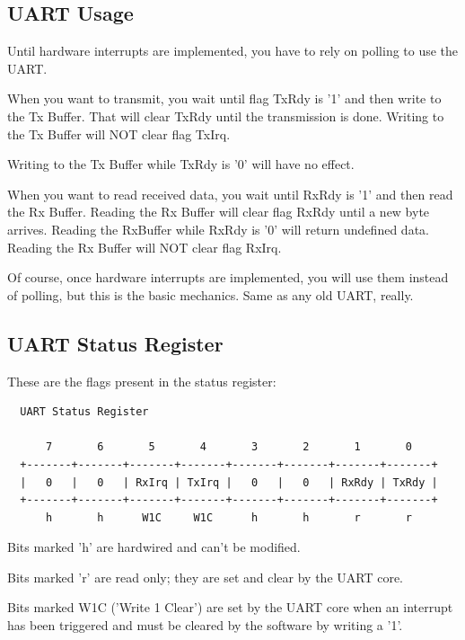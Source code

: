     
\subsection{UART Usage}
\label{soc_uart_usage}    
    
    Until hardware interrupts are implemented, you have to rely on polling to 
    use the UART.
    
    When you want to transmit, you wait until flag TxRdy is '1' and then write
    to the Tx Buffer. That will clear TxRdy until the transmission is done. 
    Writing to the Tx Buffer will NOT clear flag TxIrq. 
    
    Writing to the Tx Buffer while TxRdy is '0' will have no effect.
    
    When you want to read received data, you wait until RxRdy is '1' and then 
    read the Rx Buffer. Reading the Rx Buffer will clear flag RxRdy until a new 
    byte arrives.
    Reading the RxBuffer while RxRdy is '0' will return undefined data.
    Reading the Rx Buffer will NOT clear flag RxIrq.
    
    Of course, once hardware interrupts are implemented, you will use them 
    instead of polling, but this is the basic mechanics. Same as any old UART, 
    really.

    

\subsection{UART Status Register}
\label{soc_status_reg}    

    These are the flags present in the status register:


\begin{verbatim}
  UART Status Register

      7       6       5       4       3       2       1       0
  +-------+-------+-------+-------+-------+-------+-------+-------+
  |   0   |   0   | RxIrq | TxIrq |   0   |   0   | RxRdy | TxRdy |
  +-------+-------+-------+-------+-------+-------+-------+-------+
      h       h      W1C     W1C      h       h       r       r     
\end{verbatim}
    
    
    Bits marked 'h' are hardwired and can't be modified. 
    
    Bits marked 'r' are read only; they are set and clear by the UART core.
    
    Bits marked W1C ('Write 1 Clear') are set by the UART core when an interrupt 
    has been triggered and must be cleared by the software by writing a '1'.

